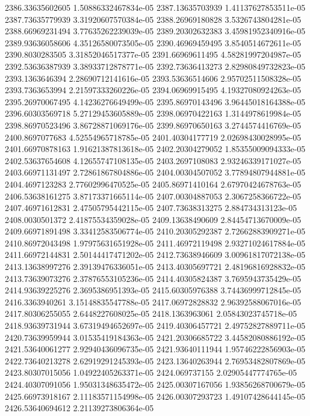 {2386.33635602605 1.50886332467834e-05
2387.13635703939 1.41137627853511e-05
2387.73635779939 3.31920607570384e-05
2388.26969180828 3.5326743804281e-05
2388.66969231494 3.77635262239039e-05
2389.20302632383 3.45981952340916e-05
2389.93636058606 4.35126580073505e-05
2390.46969459495 3.8540514672611e-05
2390.8030283505 3.31852046517377e-05
2391.66969611495 4.58281997204987e-05
2392.53636387939 3.38933712878771e-05
2392.73636413273 2.82980849732823e-05
2393.1363646394 2.28690712141616e-05
2393.53636514606 2.95702511508328e-05
2393.7363653994 2.21597333260226e-05
2394.06969915495 4.19327080924263e-05
2395.26970067495 4.14236276649499e-05
2395.86970143496 3.96445018164388e-05
2396.60303569718 5.27129453605889e-05
2398.06970422163 1.3144978619984e-05
2398.86970523496 3.86728871069176e-05
2399.86970650163 3.2744574416769e-05
2400.8697077683 4.52554965718785e-05
2401.40304177719 2.02698430028995e-05
2401.66970878163 1.91621387813618e-05
2402.20304279052 1.85355009094333e-05
2402.53637654608 4.12655747108135e-05
2403.2697108083 2.93246339171027e-05
2403.66971131497 2.72861867804886e-05
2404.00304507052 3.77894807944881e-05
2404.4697123283 2.77602996470525e-05
2405.86971410164 2.67970424678763e-05
2406.53638161275 3.87173371665114e-05
2407.00304887053 2.3067258366722e-05
2407.46971612831 2.47505795442115e-05
2407.73638313275 2.884734313123e-05
2408.0030501372 2.41875534359028e-05
2409.13638490609 2.84454713670009e-05
2409.66971891498 3.33412583506774e-05
2410.20305292387 2.72662883909271e-05
2410.86972043498 1.97975631651928e-05
2411.46972119498 2.93271024617884e-05
2411.66972144831 2.50144417471202e-05
2412.73638946609 3.00961817072138e-05
2413.13638997276 2.39139476336051e-05
2413.40305697721 2.48196816928832e-05
2413.73639073276 2.37876553105236e-05
2414.40305824387 3.7695943735429e-05
2414.93639225276 2.3695386951393e-05
2415.60305976388 3.74436999712845e-05
2416.3363940261 3.15148835547788e-05
2417.06972828832 2.96392588067016e-05
2417.80306255055 2.6448227608025e-05
2418.1363963061 2.05843023745718e-05
2418.93639731944 3.67319494652697e-05
2419.40306457721 2.49752827889711e-05
2420.73639959944 3.01535419184363e-05
2421.20306685722 3.44582080886192e-05
2421.53640061277 2.92940436096735e-05
2421.93640111944 1.95746222856903e-05
2422.73640213278 2.62919291245393e-05
2423.13640263944 2.76953482807869e-05
2423.80307015056 1.04922405263371e-05
2424.069737155 2.02905447774765e-05
2424.40307091056 1.95031348635472e-05
2425.00307167056 1.93856268700679e-05
2425.66973918167 2.11183571154998e-05
2426.00307293723 1.49107428644145e-05
2426.53640694612 2.21139273806364e-05
}
